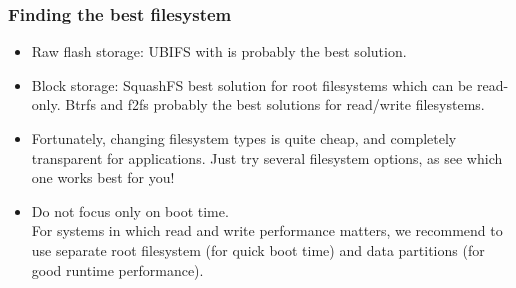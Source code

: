 \begin{frame}
\frametitle{Finding the best filesystem}
\begin{itemize}
\item Raw flash storage: UBIFS with  is
      probably the best solution.
\item Block storage: SquashFS best solution for root filesystems
      which can be read-only. Btrfs and f2fs probably the best solutions
      for read/write filesystems.
\item Fortunately, changing filesystem types is quite cheap,
      and completely transparent for applications. Just try 
      several filesystem options, as see which one works best 
      for you!
\item Do not focus only on boot time. \\
      For systems in which read and write performance matters, we 
      recommend to use separate root filesystem (for quick
      boot time) and data partitions (for good runtime performance). 
\end{itemize}
\end{frame}
